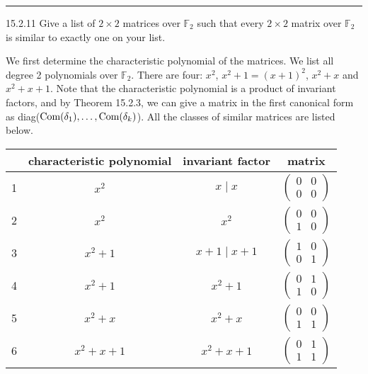 \documentclass[a4paper, 12pt]{article}
\begin{document}
\noindent\rule{7in}{2.8pt}
\begin{problem}{15.2.11}
Give a list of \(2\times 2\) matrices over \(\mathbb{F}_2\) such that every \(2\times 2\) matrix over \(\mathbb{F}_2\) is similar to exactly one on your list.
\end{problem}
\begin{solution}
We first determine the characteristic polynomial of the matrices. We list all degree 2 polynomials over \(\mathbb{F}_2\). There are four: \(x^2\), \(x^2+1=(x+1)^2\), \(x^2+x\) and \(x^2+x+1\). Note that the characteristic polynomial is a product of invariant factors, and by Theorem 15.2.3, 
we can give a matrix in the first canonical form as diag(\(\text{Com}(\delta_1),\ldots,\text{Com}(\delta_k)\)). All the classes of similar matrices are listed below. 
\begin{center}
\begin{tabular}{||c|c| c |c||} 
    \hline
	  & characteristic polynomial & invariant factor & matrix \\ [0.5ex] 
	\hline\hline
	1 & $x^2$ & $x\mid x$ & $\begin{pmatrix}
		0&0\\ 
		0&0
	\end{pmatrix}$ \\ [0.5ex]
	\hline
	2 & $x^2$ & $x^2$ &$\begin{pmatrix}
		0&0\\ 
		1&0
	\end{pmatrix}$  \\[0.5ex]
	\hline
	3 & $x^2+1$ & $x+1\mid x+1$ & $\begin{pmatrix}
		1&0\\ 
		0&1
	\end{pmatrix}$ \\[0.5ex]
	\hline
	4 & $x^2+1$ & $x^2+1$ & $\begin{pmatrix}
		0&1\\ 
		1&0
	\end{pmatrix}$ \\[0.5ex]
	\hline
	5 & $x^2+x$ & $x^2+x$ & $\begin{pmatrix}
		0&0\\ 
		1&1
	\end{pmatrix}$ \\ [0.5ex]
	\hline 
	6 & $x^2+x+1$ & $x^2+x+1$ & $\begin{pmatrix}
		0&1\\ 
		1&1
	\end{pmatrix}$ \\ [1ex] 
	\hline
   \end{tabular}
\end{center}
\end{solution}
\end{document}

